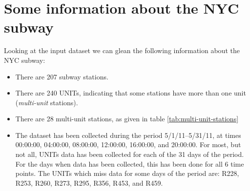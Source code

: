 \documentclass{article}
\begin{document}
\section{Some information about the NYC subway}

Looking at the input dataset we can glean the following information about the NYC subway:
\begin{itemize}
\item There are 207 subway stations.
\item There are 240 UNITs, indicating that some stations have more than one unit (\emph{multi-unit} stations).
\item There are 28 multi-unit stations, as given in table \ref{tab:multi-unit-stations}
\item The dataset has been collected during the period 5/1/11--5/31/11, at times 00:00:00, 04:00:00, 08:00:00, 12:00:00, 16:00:00, and 20:00:00. For most, but not all, UNITs data has been collected for each of the 31 days of the period. For the days when data has been collected, this has been done for all 6 time points. The UNITs  which miss data for some days of the period are: R228, R253, R260, R273, R295, R356, R453, and R459.
\end{itemize}
\end{document}
